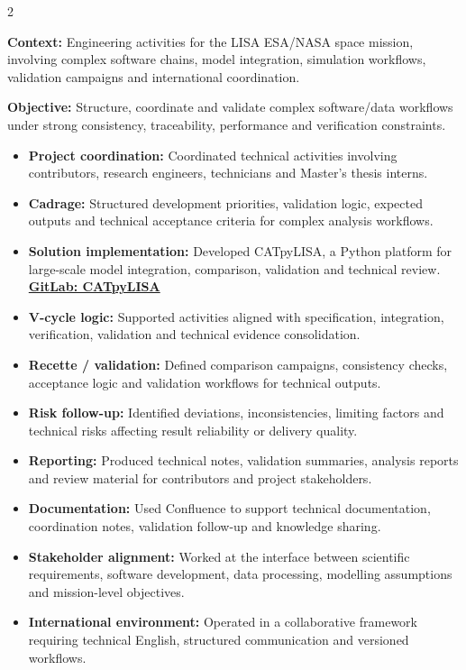 \documentclass[8pt,a4paper,ragged2e,withhyper]{altacv}
\begin{document}
\begin{paracol}{2}
\divider


\textbf{Context:} Engineering activities for the LISA ESA/NASA space mission, involving complex software chains, model integration, simulation workflows, validation campaigns and international coordination.

\textbf{Objective:} Structure, coordinate and validate complex software/data workflows under strong consistency, traceability, performance and verification constraints.

\begin{itemize}
  \item \textbf{Project coordination:} Coordinated technical activities involving contributors, research engineers, technicians and Master's thesis interns.
  \item \textbf{Cadrage:} Structured development priorities, validation logic, expected outputs and technical acceptance criteria for complex analysis workflows.
  \item \textbf{Solution implementation:} Developed CATpyLISA, a Python platform for large-scale model integration, comparison, validation and technical review.
  \textcolor{DarkPastelRed}{\href{https://gitlab.oca.eu/gboileau/lisa_l3_tools}{\bf GitLab: CATpyLISA}}
  \item \textbf{V-cycle logic:} Supported activities aligned with specification, integration, verification, validation and technical evidence consolidation.
  \item \textbf{Recette / validation:} Defined comparison campaigns, consistency checks, acceptance logic and validation workflows for technical outputs.
  \item \textbf{Risk follow-up:} Identified deviations, inconsistencies, limiting factors and technical risks affecting result reliability or delivery quality.
  \item \textbf{Reporting:} Produced technical notes, validation summaries, analysis reports and review material for contributors and project stakeholders.
  \item \textbf{Documentation:} Used Confluence to support technical documentation, coordination notes, validation follow-up and knowledge sharing.
  \item \textbf{Stakeholder alignment:} Worked at the interface between scientific requirements, software development, data processing, modelling assumptions and mission-level objectives.
  \item \textbf{International environment:} Operated in a collaborative framework requiring technical English, structured communication and versioned workflows.
\end{itemize}


\end{paracol}
\end{document}
